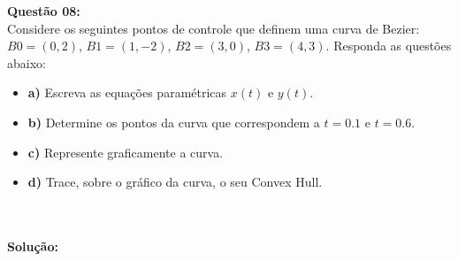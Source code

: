\documentclass[a4paper, 12pt]{article}
\begin{document}
\vspace{1cm}
\noindent\textbf{Questão 08:}\\
Considere os seguintes pontos de controle que definem uma curva de Bezier: $B0 = (0,2)$, $B1 = (1,-2)$, $B2 = (3,0)$,
$B3 = (4,3)$. Responda as questões abaixo:
\begin{itemize}
\item\textbf{a)} Escreva as equações paramétricas $x(t)$ e $y(t)$.
\item\textbf{b)} Determine os pontos da curva que correspondem a $t=0.1$ e $t=0.6$.
\item\textbf{c)} Represente graficamente a curva.
\item\textbf{d)} Trace, sobre o gráfico da curva, o seu Convex Hull.
\end{itemize}
\\
\\
\noindent\textbf{Solução:}
\end{document}
